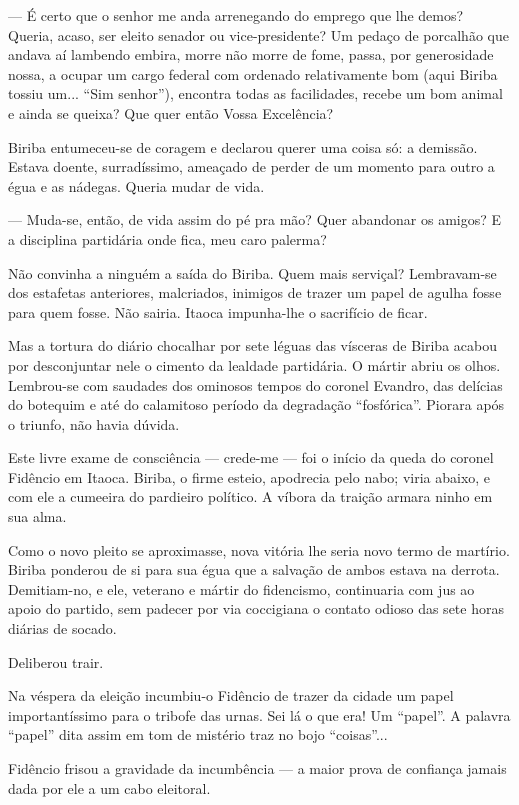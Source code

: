 --- É certo que o senhor me anda arrenegando do emprego que lhe demos?
Queria, acaso, ser eleito senador ou vice-presidente? Um pedaço de
porcalhão que andava aí lambendo embira, morre não morre de fome, passa,
por generosidade nossa, a ocupar um cargo federal com ordenado
relativamente bom (aqui Biriba tossiu um... ``Sim senhor''), encontra
todas as facilidades, recebe um bom animal e ainda se queixa? Que quer
então Vossa Excelência?

Biriba entumeceu-se de coragem e declarou querer uma coisa só: a
demissão. Estava doente, surradíssimo, ameaçado de perder de um momento
para outro a égua e as nádegas. Queria mudar de vida.

--- Muda-se, então, de vida assim do pé pra mão? Quer abandonar os
amigos? E a disciplina partidária onde fica, meu caro palerma?

Não convinha a ninguém a saída do Biriba. Quem mais serviçal?
Lembravam-se dos estafetas anteriores, malcriados, inimigos de trazer um
papel de agulha fosse para quem fosse. Não sairia. Itaoca impunha-lhe o
sacrifício de ficar.

Mas a tortura do diário chocalhar por sete léguas das vísceras de Biriba
acabou por desconjuntar nele o cimento da lealdade partidária. O mártir
abriu os olhos. Lembrou-se com saudades dos ominosos tempos do coronel
Evandro, das delícias do botequim e até do calamitoso período da
degradação ``fosfórica''. Piorara após o triunfo, não havia dúvida.

Este livre exame de consciência --- crede-me --- foi o início da queda
do coronel Fidêncio em Itaoca. Biriba, o firme esteio, apodrecia pelo
nabo; viria abaixo, e com ele a cumeeira do pardieiro político. A víbora
da traição armara ninho em sua alma.

Como o novo pleito se aproximasse, nova vitória lhe seria novo termo de
martírio. Biriba ponderou de si para sua égua que a salvação de ambos
estava na derrota. Demitiam-no, e ele, veterano e mártir do fidencismo,
continuaria com jus ao apoio do partido, sem padecer por via coccigiana
o contato odioso das sete horas diárias de socado.

Deliberou trair.

Na véspera da eleição incumbiu-o Fidêncio de trazer da cidade um papel
importantíssimo para o tribofe das urnas. Sei lá o que era! Um
``papel''. A palavra ``papel'' dita assim em tom de mistério traz no
bojo ``coisas''...

Fidêncio frisou a gravidade da incumbência --- a maior prova de
confiança jamais dada por ele a um cabo eleitoral.

